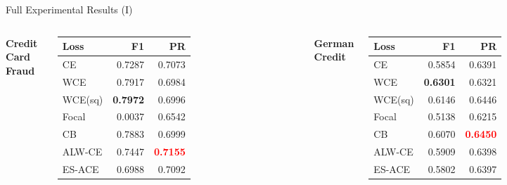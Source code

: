\documentclass[aspectratio=169]{beamer}
\renewcommand{\textbf}[1]{\textcolor{SejongBlue}{\sf\bfseries #1}}
\begin{document}
\begin{frame}{Full Experimental Results (I)}
\scriptsize
\renewcommand{\arraystretch}{0.85}

\begin{columns}[T, totalwidth=\textwidth]


\textbf{Credit Card Fraud}
\begin{tabular}{lrr}
\toprule
Loss & F1 & PR \\
\midrule
CE & 0.7287 & 0.7073 \\
WCE & 0.7917 & 0.6984 \\
WCE(sq) & \textcolor{SejongBlue}{\textbf{0.7972}} & 0.6996 \\
Focal & 0.0037 & 0.6542 \\
CB & 0.7883 & 0.6999 \\
\textcolor{SejongBlue}{ALW-CE} & 0.7447 & \textcolor{red}{\textbf{0.7155}} \\
\textcolor{SejongBlue}{ES-ACE} & 0.6988 & 0.7092 \\
\bottomrule
\end{tabular}

\vspace{0.8em}

\textbf{German Credit}
\begin{tabular}{lrr}
\toprule
Loss & F1 & PR \\
\midrule
CE & 0.5854 & 0.6391 \\
WCE & \textcolor{SejongBlue}{\textbf{0.6301}} & 0.6321 \\
WCE(sq) & 0.6146 & 0.6446 \\
Focal & 0.5138 & 0.6215 \\
CB & 0.6070 & \textcolor{red}{\textbf{0.6450}} \\
\textcolor{SejongBlue}{ALW-CE} & 0.5909 & 0.6398 \\
\textcolor{SejongBlue}{ES-ACE} & 0.5802 & 0.6397 \\
\bottomrule
\end{tabular}



\end{columns}
\end{frame}
\end{document}
